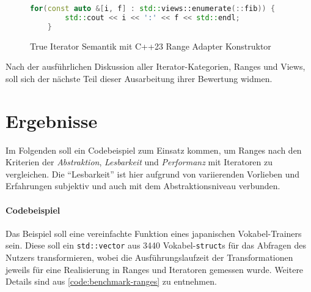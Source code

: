 \documentclass[runningheads]{llncs}
\begin{document}
\begin{figure}
	\vspace{-.5em}
	\caption{True Iterator Semantik mit C++23 Range Adapter Konstruktor}
	\label{code:true-iterator-range}

	\begin{lstlisting}[language=C++]
	for(const auto &[i, f] : std::views::enumerate(::fib)) {
		std::cout << i << ':' << f << std::endl;
	}
	\end{lstlisting}

	\vspace{-1em}
\end{figure}

Nach der ausführlichen Diskussion aller Iterator-Kategorien, Ranges und Views, soll sich der nächste Teil dieser Ausarbeitung ihrer Bewertung widmen.

\section{Ergebnisse}

Im Folgenden soll ein Codebeispiel zum Einsatz kommen, um Ranges nach den Kriterien der \textit{Abstraktion}, \textit{Lesbarkeit} und \textit{Performanz} mit Iteratoren zu vergleichen.
Die \enquote{Lesbarkeit} ist hier aufgrund von variierenden Vorlieben und Erfahrungen subjektiv und auch mit dem Abstraktionsniveau verbunden.

\paragraph{Codebeispiel}
Das Beispiel soll eine vereinfachte Funktion eines japanischen Vokabel-Trainers sein.
Diese soll ein \texttt{std::vector} aus 3440 Vokabel-\texttt{struct}s für das Abfragen des Nutzers transformieren, wobei die Ausführungslaufzeit der Transformationen jeweils für eine Realisierung in Ranges und Iteratoren gemessen wurde.
Weitere Details sind aus \autoref{code:benchmark-ranges} zu entnehmen.
\end{document}
